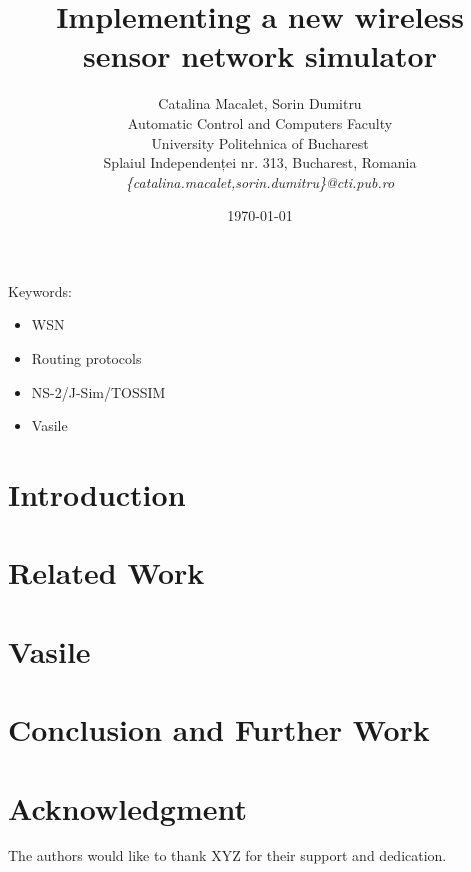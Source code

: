 \documentclass[12pt]{article}
\title{Implementing a new wireless sensor network simulator}
\author{Catalina Macalet, Sorin Dumitru\\
Automatic Control and Computers Faculty\\
University Politehnica of Bucharest\\
Splaiul Independenței nr. 313, Bucharest, Romania \\
\emph{\{catalina.macalet,sorin.dumitru\}@cti.pub.ro}}
\date{\today}
\newcommand{\codename}{Vasile }
\begin{document}
\maketitle

\begin{abstract}

\end{abstract}

Keywords:
\begin{itemize}
  \item WSN
  \item Routing protocols
  \item NS-2/J-Sim/TOSSIM
  \item \codename
\end{itemize}

\section{Introduction}
\label{sec:introduction}


\section{Related Work}
\label{sec:relatedwork}


\section{\codename}
\label{sec:simulator}


\section{Conclusion and Further Work}
\label{sec:conclusion}


\section*{Acknowledgment}
\label{sec:acknowledgment}

The authors would like to thank XYZ for their support and dedication.



\end{document}
